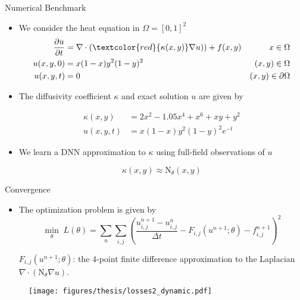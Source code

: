 \documentclass[usenames,dvipsnames]{beamer}
\begin{document}
\begin{frame}{Numerical Benchmark}
\begin{itemize}
\item We consider the heat equation in $\Omega = [0,1]^2$
\begin{equation*}
	\begin{aligned}
		\frac{\partial u}{\partial t} &= \nabla \cdot (\textcolor{red}{\kappa(x, y)} \nabla u))+  f(x, y) & x\in \Omega\\ 
		u(x,y,0) &= x(1-x)y^2(1-y)^2 & (x,y)\in \Omega\\
		u(x,y,t) &= 0 & (x,y)\in  \partial \Omega
	\end{aligned}
\end{equation*}

\item The diffusivity coefficient $\kappa$ and exact solution $u$ are given by 

\begin{equation*}
\begin{aligned}
	\kappa(x,y) &= 2x^2 - 1.05x^4 + x^6 +xy+y^2\\ 
	u(x,y,t) &= x(1-x)y^2(1-y)^2 e^{-t}
\end{aligned}
\end{equation*}

\item We learn a DNN approximation to $\kappa$ using full-field observations of $u$

$$\kappa(x,y) \approx \text{N}_\theta(x, y)$$
\end{itemize}
\end{frame}


\begin{frame}{Convergence}
	\begin{itemize}
		
		\item The optimization problem is given by 
		\begin{equation*}
			\min_\theta\; L(\theta) = \sum_n\sum_{i,j} \left(\frac{u_{i,j}^{n+1} - u_{i,j}^n}{\Delta t} - F_{i,j}( u^{n+1}; \theta) -  f^{n+1}_{i,j}\right)^2 
		\end{equation*}
		
		$F_{i,j}(u^{n+1}; \theta)$: the 4-point finite difference approximation to the Laplacian $\nabla\cdot (\text{N}_\theta \nabla u)$.
		
	
		\end{itemize}
	
		\begin{figure}[htbp]
		\centering
		\texttt{[image: figures/thesis/losses2\_dynamic.pdf]}
	\end{figure}
	
\end{frame}
\end{document}
